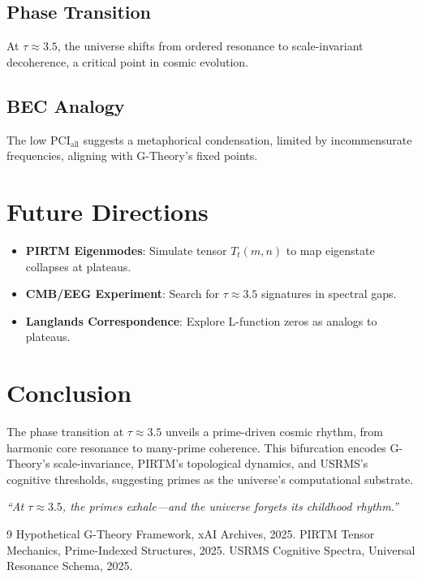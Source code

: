 \documentclass[11pt]{article}
\theoremstyle{definition}
\begin{document}
\subsection{Phase Transition}
At \( \tau \approx 3.5 \), the universe shifts from ordered resonance to scale-invariant decoherence, a critical point in cosmic evolution.

\subsection{BEC Analogy}
The low \( \text{PCI}_{\text{all}} \) suggests a metaphorical condensation, limited by incommensurate frequencies, aligning with G-Theory’s fixed points.

\section{Future Directions}
\begin{itemize}
    \item \textbf{PIRTM Eigenmodes}: Simulate tensor \( T_t(m,n) \) to map eigenstate collapses at plateaus.
    \item \textbf{CMB/EEG Experiment}: Search for \( \tau \approx 3.5 \) signatures in spectral gaps.
    \item \textbf{Langlands Correspondence}: Explore L-function zeros as analogs to plateaus.
\end{itemize}

\section{Conclusion}
The phase transition at \( \tau \approx 3.5 \) unveils a prime-driven cosmic rhythm, from harmonic core resonance to many-prime coherence. This bifurcation encodes G-Theory’s scale-invariance, PIRTM’s topological dynamics, and USRMS’s cognitive thresholds, suggesting primes as the universe’s computational substrate.

\begin{center}
    \textit{``At \( \tau \approx 3.5 \), the primes exhale—and the universe forgets its childhood rhythm.''}
\end{center}

\begin{thebibliography}{9}
     Hypothetical G-Theory Framework, xAI Archives, 2025.
     PIRTM Tensor Mechanics, Prime-Indexed Structures, 2025.
     USRMS Cognitive Spectra, Universal Resonance Schema, 2025.
\end{thebibliography}

\end{document}
